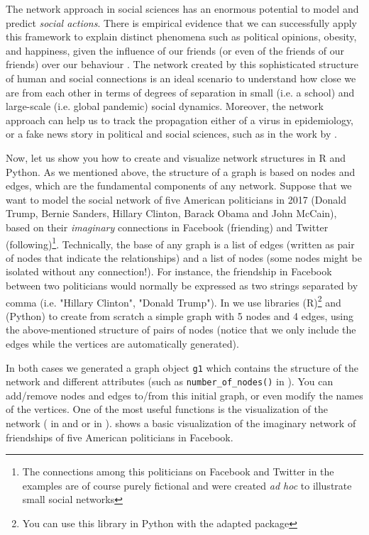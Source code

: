 The network approach in social sciences has an enormous potential to model and predict \textit{social actions}. There is empirical evidence that we can successfully apply this framework to explain distinct phenomena such as political opinions, obesity, and happiness, given the influence of our friends (or even of the friends of our friends) over our behaviour \citep{christakis2009connected}. The network created by this sophisticated structure of human and social connections is an ideal scenario to understand how close we are from each other in terms of degrees of separation \citep{watts2004six} in small (i.e. a school) and large-scale (i.e. global pandemic) social dynamics. Moreover, the network approach can help us to track the propagation either of a virus in epidemiology, or a fake news story in political and social sciences, such as in the work by 
\citet{vosoughi2018spread}. 

Now, let us show you how to create and visualize network structures in R and Python. As we mentioned above, the structure of a graph is based on nodes and edges, which are the fundamental components of any network. Suppose that we want to model the social network of five American politicians in 2017 (Donald Trump, Bernie Sanders, Hillary Clinton, Barack Obama and John McCain), based on their \textit{imaginary} connections in Facebook (friending) and Twitter (following)\footnote{The connections among this politicians on Facebook and Twitter in the examples are of course purely fictional and were created \textit{ad hoc} to illustrate small social networks}. Technically, the base of any graph is a list of edges (written as pair of nodes that indicate the relationships) and a list of nodes (some nodes might be isolated without any connection!).  For instance, the friendship in Facebook between two politicians would normally be expressed as two strings separated by comma (i.e. "Hillary Clinton", "Donald Trump"). In  we use libraries  (R)\footnote{You can use this library in Python with the adapted package } and  (Python) to create from scratch a simple graph with 5 nodes and 4 edges, using the above-mentioned structure of pairs of nodes (notice that we only include the edges while the vertices are automatically generated).


In both cases we generated a graph object \texttt{g1} which contains the structure of the network and different attributes (such as \verb|number_of_nodes()| in ). You can add/remove nodes and edges to/from this initial graph, or even modify the names of the vertices. One of the most useful functions is the visualization of the network ( in  and  or  in ).  shows a basic visualization of the imaginary network of friendships of five American politicians in Facebook.


